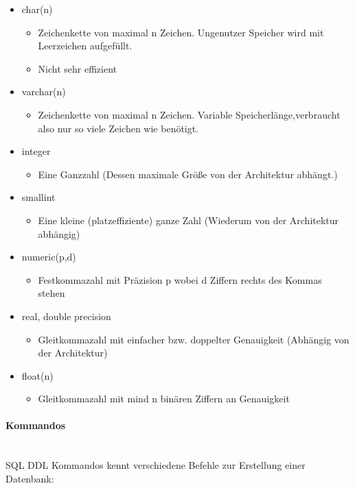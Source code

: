 \documentclass{article}
\newcommand{\paragraphlb}[1]{\paragraph{#1}\mbox{}\\}
\begin{document}
 	\begin{itemize}
 		\item{char(n)}
 		\begin{itemize}
 			\item{Zeichenkette von maximal n Zeichen. Ungenutzer Speicher wird mit Leerzeichen aufgefüllt.}
 			\item{Nicht sehr effizient}
 		\end{itemize}
 		\item{varchar(n)}
 		\begin{itemize}
 			\item{Zeichenkette von maximal n Zeichen. Variable Speicherlänge,verbraucht also nur so viele Zeichen wie benötigt.}
 		\end{itemize}
 		\item{integer}
 		\begin{itemize}
 			\item{Eine Ganzzahl (Dessen maximale Größe von der Architektur abhängt.)}
 		\end{itemize}
 		\item{smallint}
 		\begin{itemize}
 			\item{Eine kleine (platzeffiziente) ganze Zahl (Wiederum von der Architektur abhängig)}
 		\end{itemize}
 		\item{numeric(p,d)}
 		\begin{itemize}
 			\item{Festkommazahl mit Präzision p wobei d Ziffern rechts des Kommas stehen}
 		\end{itemize}
 		\item{real, double precision}
 		\begin{itemize}
 			\item{Gleitkommazahl mit einfacher bzw. doppelter Genauigkeit (Abhängig von der Architektur)}
 		\end{itemize}
 		\item{float(n)}
 		\begin{itemize}
 			\item{Gleitkommazahl mit mind n binären Ziffern an Genauigkeit}
 		\end{itemize}
 	\end{itemize}
 	\paragraphlb{Kommandos}
 	SQL DDL Kommandos kennt verschiedene Befehle zur Erstellung einer Datenbank:
\end{document}
